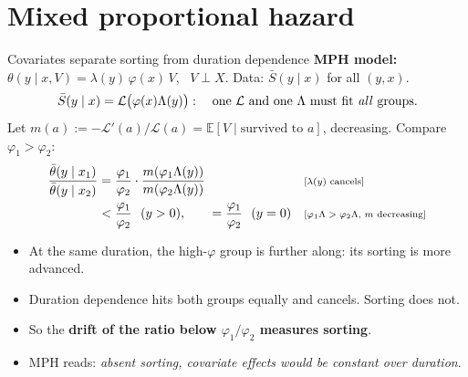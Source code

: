 \documentclass[aspectratio=169,10pt]{beamer}
\newcommand{\E}{\mathbb{E}}
\newcommand{\Lap}{\mathcal{L}}
\newcommand{\why}[1]{\text{\scriptsize[#1]}}
\begin{document}
\section{Mixed proportional hazard}
\begin{frame}[label=m-ratio]{Covariates separate sorting from duration dependence}
  \textbf{MPH model:} $\theta(y\mid x,V)=\lambda(y)\,\varphi(x)\,V$, \ $V\perp X$. Data: $\bar S(y\mid x)$ for all $(y,x)$.
  \[ \bar S(y\mid x)=\Lap\big(\varphi(x)\Lambda(y)\big): \quad \text{one } \Lap \text{ and one } \Lambda \text{ must fit \emph{all} groups.} \]
  Let $m(a):=-\Lap'(a)/\Lap(a)=\E[V\mid\text{survived to }a]$, decreasing. Compare $\varphi_1>\varphi_2$:
  \begin{align*}
    \frac{\bar\theta(y\mid x_1)}{\bar\theta(y\mid x_2)} &= \frac{\varphi_1}{\varphi_2}\cdot\frac{m(\varphi_1\Lambda(y))}{m(\varphi_2\Lambda(y))} && \why{$\lambda(y)$ cancels} \\
    &< \frac{\varphi_1}{\varphi_2}\ \ (y>0), \qquad =\frac{\varphi_1}{\varphi_2}\ \ (y=0) && \why{$\varphi_1\Lambda>\varphi_2\Lambda$, $m$ decreasing}
  \end{align*}
  \begin{itemize}
    \item At the same duration, the high-$\varphi$ group is further along: its sorting is more advanced.
    \item Duration dependence hits both groups equally and cancels. Sorting does not.
    \item So the \textbf{drift of the ratio below $\varphi_1/\varphi_2$ measures sorting}.
    \item MPH reads: \emph{absent sorting, covariate effects would be constant over duration}.
  \end{itemize}
  \vfill\hfill\hyperlink{p-ratio}{}
\end{frame}
\end{document}
